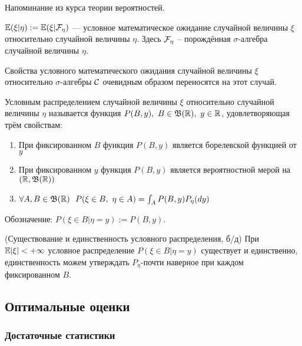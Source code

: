 \begin{note}
    Напоминание из курса теории вероятностей.
\end{note}

\begin{definition}
    $\mathbb{E}(\xi | \eta) := \mathbb{E}(\xi | \mathcal{F}_\eta)$ --- условное математическое ожидание случайной величины $\xi$ относительно случайной величины $\eta$. Здесь $\mathcal{F}_\eta$ -- порождённая $\sigma$-алгебра случайной величины $\eta$.
\end{definition}

\begin{note}
    Свойства условного математического ожидания случайной величины $\xi$ относительно $\sigma$-алгебры $\mathcal{C}$ очевидным образом переносятся на этот случай.
\end{note}

\begin{definition}
    Условным распределением случайной величины $\xi$ относительно случайной величины $\eta$ называется функция $P(B, y),\ B \in \mathfrak{B}(\mathbb{R}),\ y \in \mathbb{R}$, удовлетворяющая трём свойствам:
    \begin{enumerate}
        \item При фиксированном $B$ функция $P(B, y)$ является борелевской функцией от $y$
        \item При фиксированном $y$ функция $P(B, y)$ является вероятностной мерой на $(\mathbb{R}, \mathfrak{B}(\mathbb{R}))$
        \item $\forall A, B \in \mathfrak{B}(\mathbb{R}) \ \ P(\xi \in B,\ \eta \in A) = \int_A P(B, y) P_\eta(dy)$
    \end{enumerate}
    Обозначение: $P(\xi \in B | \eta = y) := P(B, y)$.
\end{definition}

\begin{theorem} (Существование и единственность условного распределения, б/д)
    При $\mathbb{E}|\xi| < +\infty$ условное распределение $P(\xi \in B | \eta = y)$ существует и единственно, единственность можем утверждать $P_\eta$-почти наверное при каждом фиксированном $B$.
\end{theorem}

\subsection{Оптимальные оценки}

\subsubsection{Достаточные статистики}

